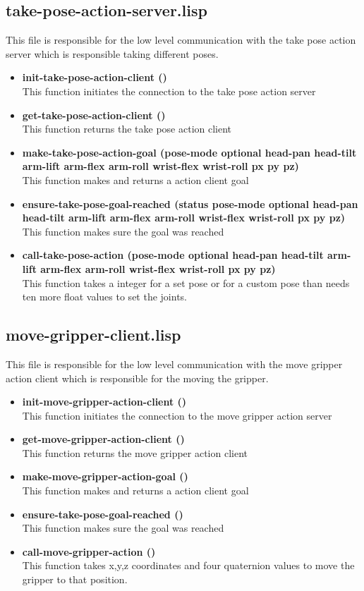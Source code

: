 \documentclass[main.tex]{subfiles}
\begin{document}
		\subsection{take-pose-action-server.lisp}
		This file is responsible for the low level communication with the
		take pose action server which is responsible taking different poses.
		\begin{itemize}
			\item \textbf{init-take-pose-action-client ()} \\
			This function initiates the connection to the take pose action server
			\item \textbf{get-take-pose-action-client ()} \\
			This function returns the take pose action client
			\item \textbf{make-take-pose-action-goal (pose-mode optional head-pan head-tilt arm-lift arm-flex arm-roll wrist-flex wrist-roll px py pz)} \\
			This function makes and returns a action client goal
			\item \textbf{ensure-take-pose-goal-reached (status pose-mode optional head-pan head-tilt arm-lift arm-flex arm-roll wrist-flex wrist-roll px py pz)} \\
            This function makes sure the goal was reached
			\item \textbf{call-take-pose-action (pose-mode optional head-pan head-tilt arm-lift arm-flex arm-roll wrist-flex wrist-roll px py pz)} \\
			This function takes a integer for a set pose or for a custom pose than needs ten more float values to set the joints.
		\end{itemize}
		\subsection{move-gripper-client.lisp}
		This file is responsible for the low level communication with the
		move gripper action client which is responsible for the moving the gripper.
		\begin{itemize}
			\item \textbf{init-move-gripper-action-client ()} \\
			This function initiates the connection to the move gripper action server
			\item \textbf{get-move-gripper-action-client ()} \\
			This function returns the move gripper action client
			\item \textbf{make-move-gripper-action-goal ()} \\
			This function makes and returns a action client goal
			\item \textbf{ensure-take-pose-goal-reached ()} \\
            This function makes sure the goal was reached
			\item \textbf{call-move-gripper-action ()} \\
			This function takes x,y,z coordinates and four quaternion values to move the gripper to that position. 
		\end{itemize}
\end{document}

